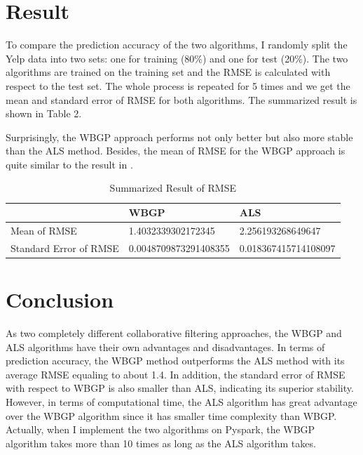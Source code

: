 \documentclass{article}
\begin{document}
\section*{Result} %

\noindent To compare the prediction accuracy of the two algorithms, I randomly split the Yelp data into 
two sets: one for training (80\%) and one for test (20\%). The two algorithms are trained on the training 
set and the RMSE is calculated with respect to the test set. The whole process is repeated for 5 times 
and we get the mean and standard error of RMSE for both algorithms. The summarized result is shown in Table 2.

\indent Surprisingly, the WBGP approach performs not only better but also more stable than the ALS 
method. Besides, the mean of RMSE for the WBGP approach is quite similar to the result in \cite{sawant2013collaborative}.

\begin{table}[H]
\centering
\begin{tabular}{|l|l|l|} 
\hline
                       & WBGP                  & ALS                   \\ 
\hline
Mean of RMSE           & 1.4032339302172345    & 2.256193268649647     \\ 
\hline
Standard Error of RMSE & 0.0048709873291408355 & 0.018367415714108097  \\
\hline
\end{tabular}
\caption{Summarized Result of RMSE}
\label{table2}
\end{table}


\section*{Conclusion} %

\noindent As two completely different collaborative filtering approaches, the WBGP and ALS algorithms 
have their own advantages and disadvantages. In terms of prediction accuracy, the WBGP method outperforms 
the ALS method with its average RMSE equaling to about 1.4. In addition, the standard error of RMSE with 
respect to WBGP is also smaller than ALS, indicating its superior stability. However, in terms of 
computational time, the ALS algorithm has great advantage over the WBGP algorithm since it has smaller 
time complexity \cite{st446lecturenotes} than WBGP. Actually, when I implement the two algorithms on Pyspark, the WBGP algorithm 
takes more than 10 times as long as the ALS algorithm takes.
\end{document}
